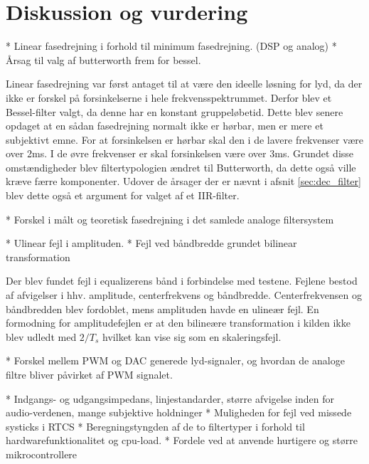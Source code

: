 \chapter{Diskussion og vurdering}\label{kap:diskussion}




* Linear fasedrejning i forhold til minimum fasedrejning. (DSP og analog)
* Årsag til valg af butterworth frem for bessel. 

Linear fasedrejning var først antaget til at være den ideelle løsning for lyd, da der ikke er forskel på forsinkelserne i hele frekvensspektrummet. Derfor blev et Bessel-filter valgt, da denne har en konstant gruppeløbetid. 
Dette blev senere opdaget at en sådan fasedrejning normalt ikke er hørbar, men er mere et subjektivt emne. 
For at forsinkelsen er hørbar skal den i de lavere frekvenser være over 2ms. 
I de øvre frekvenser er skal forsinkelsen være over 3ms.
Grundet disse omstændigheder blev filtertypologien ændret til Butterworth, da dette også ville kræve færre komponenter. 
Udover de årsager der er nævnt i afsnit \ref{sec:dec_filter} blev dette også et argument for valget af et IIR-filter. 


* Forskel i målt og teoretisk fasedrejning i det samlede analoge filtersystem


* Ulinear fejl i amplituden.
* Fejl ved båndbredde grundet bilinear transformation 

Der blev fundet fejl i equalizerens bånd i forbindelse med testene. Fejlene bestod af afvigelser i hhv. amplitude, centerfrekvens og båndbredde. Centerfrekvensen og båndbredden blev fordoblet, mens amplituden havde en ulineær fejl. 
En formodning for amplitudefejlen er at den bilineære transformation i kilden ikke blev udledt med $2/T_s$ hvilket kan vise sig som en skaleringsfejl.




* Forskel mellem PWM og DAC generede lyd-signaler, og hvordan de analoge filtre bliver påvirket af PWM signalet.



* Indgangs- og udgangsimpedans, linjestandarder, større afvigelse inden for audio-verdenen, mange subjektive holdninger
* Muligheden for fejl ved missede systicks i RTCS
* Beregningstyngden af de to filtertyper i forhold til hardwarefunktionalitet og cpu-load. 
* Fordele ved at anvende hurtigere og større mikrocontrollere



